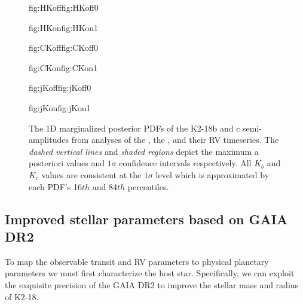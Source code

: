 \begin{figure}
  \centering
  \hspace{-0.6\hsize}%
  \begin{ocg}{fig:HKoff}{fig:HKoff}{0}%
  \end{ocg}%
  \begin{ocg}{fig:HKon}{fig:HKon}{1}%
  \end{ocg}
  \hspace{-0.6\hsize}%
  \begin{ocg}{fig:CKoff}{fig:CKoff}{0}%
  \end{ocg}%
  \begin{ocg}{fig:CKon}{fig:CKon}{1}%
  \end{ocg}
  \hspace{-0.6\hsize}%
  \begin{ocg}{fig:jKoff}{fig:jKoff}{0}%
  \end{ocg}%
  \begin{ocg}{fig:jKon}{fig:jKon}{1}%
  \end{ocg}
  \hspace{-0.6\hsize}%
  \caption[Marginalized posterior PDFs of $K_b$ and $K_c$ with HARPS and CARMENES.]
    {\small The 1D marginalized posterior PDFs of the K2-18b and c semi-amplitudes from analyses
    of the
    , the
    , and their
     RV timeseries. The
    \emph{dashed vertical lines} and \emph{shaded regions} depict the maximum a posteriori values
    and $1\sigma$ confidence intervals respectively. 
    All $K_b$ and $K_c$ values are consistent at the $1\sigma$ level which is approximated by each
    PDF's 16${th}$ and 84${th}$ percentiles.}
  \label{k2182fig:postK}
\end{figure}


\subsection{Improved stellar parameters based on GAIA DR2}
To map the observable transit and RV parameters to physical planetary parameters we must first characterize the
host star. Specifically, we can exploit the exquisite precision of the GAIA DR2 to improve the stellar mass and
radius of K2-18.

